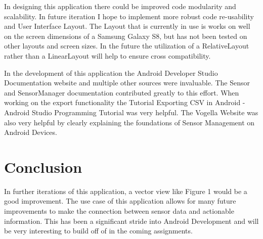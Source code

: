 \documentclass{article}
\begin{document}
In designing this application there could be improved code modularity and scalability. In future iteration I hope to implement more robust code re-usability and User Interface Layout. The Layout that is currently in use is works on well on the screen dimensions of a Samsung Galaxy S8, but has not been tested on other layouts and screen sizes. In the future the utilization of a RelativeLayout rather than a LinearLayout will help to ensure cross compatibility. 

In the development of this application the Android Developer Studio Documentation website and multiple other sources were invaluable. The Sensor and SensorManager documentation contributed greatly to this effort. \citep{IntentDocs} When working on the export functionality the Tutorial Exporting CSV in Android - Android Studio Programming Tutorial was very helpful. \citep{exportTut} The Vogella Website was also very helpful by clearly explaining the foundations of Sensor Management on Android Devices. \citep{Vogella}

\section{Conclusion}
In further iterations of this application, a vector view like Figure 1 would be a good improvement. The use case of this application allows for many future improvements to make the connection between sensor data and actionable information. This has been a significant stride into Android Development and will be very interesting to build off of in the coming assignments. 



\end{document}
